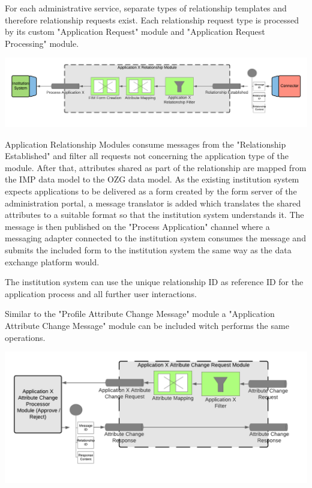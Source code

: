 For each administrative service, separate types of relationship templates and therefore relationship requests exist. Each relationship request type is processed by its custom "Application Request" module and "Application Request Processing" module. 

\begin{center}
    \includegraphics[scale=0.6]{Diagrams/Integration Architecture 2/Application Relationship Module.pdf}
\end{center}

Application Relationship Modules consume messages from the "Relationship Established" and filter all requests not concerning the application type of the module. After that, attributes shared as part of the relationship are mapped from the IMP data model to the OZG data model. As the existing institution system expects applications to be delivered as a form created by the form server of the administration portal, a message translator is added which translates the shared attributes to a suitable format so that the institution system understands it. The message is then published on the "Process Application" channel where a messaging adapter connected to the institution system consumes the message and submits the included form to the institution system the same way as the data exchange platform would.

The institution system can use the unique relationship ID as reference ID for the application process and all further user interactions.

Similar to the "Profile Attribute Change Message" module a "Application Attribute Change Message" module can be included witch performs the same operations.

\begin{center}
    \includegraphics[scale=0.6]{Diagrams/Integration Architecture 2/Application Attribute Change Request Module.pdf}
\end{center}

